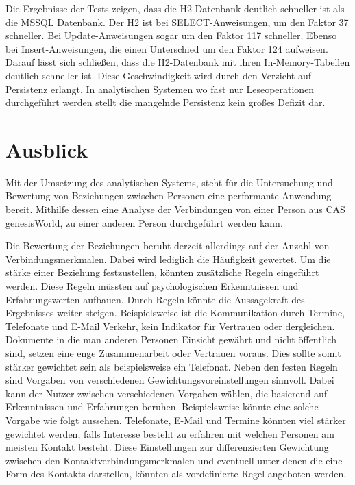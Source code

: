 Die Ergebnisse der Tests zeigen, dass die H2-Datenbank deutlich schneller ist als die MSSQL Datenbank. Der H2 ist bei SELECT-Anweisungen, um den Faktor 37 schneller. Bei Update-Anweisungen sogar um den Faktor 117 schneller. Ebenso bei Insert-Anweisungen, die einen Unterschied um den Faktor 124 aufweisen. Darauf lässt sich schließen, dass die H2-Datenbank mit ihren In-Memory-Tabellen deutlich schneller ist. Diese Geschwindigkeit wird durch den Verzicht auf Persistenz erlangt. In analytischen Systemen wo fast nur Leseoperationen durchgeführt werden stellt die mangelnde Persistenz kein großes Defizit dar. 

\section{Ausblick}
\label{ch:Ergebnis:sec:Ausblick}

Mit der Umsetzung des analytischen Systems, steht für die Untersuchung und Bewertung von Beziehungen zwischen Personen eine performante Anwendung bereit. Mithilfe dessen eine Analyse der Verbindungen von einer Person aus CAS genesisWorld, zu einer anderen Person durchgeführt werden kann.  

Die Bewertung der Beziehungen beruht derzeit allerdings auf der Anzahl von Verbindungsmerkmalen. Dabei wird lediglich die Häufigkeit gewertet. Um die stärke einer Beziehung festzustellen, könnten zusätzliche Regeln eingeführt werden. Diese Regeln müssten auf psychologischen Erkenntnissen und Erfahrungswerten aufbauen. Durch Regeln könnte die Aussagekraft des Ergebnisses weiter steigen. Beispielsweise ist die Kommunikation durch Termine, Telefonate und E-Mail Verkehr, kein Indikator für Vertrauen oder dergleichen. Dokumente in die man anderen Personen Einsicht gewährt und nicht öffentlich sind, setzen eine enge Zusammenarbeit oder Vertrauen voraus. Dies sollte somit stärker gewichtet sein als beispielsweise ein Telefonat. Neben den festen Regeln sind Vorgaben von verschiedenen Gewichtungsvoreinstellungen sinnvoll. Dabei kann der Nutzer zwischen verschiedenen Vorgaben wählen, die basierend auf Erkenntnissen und Erfahrungen beruhen. Beispielsweise könnte eine solche Vorgabe wie folgt aussehen. Telefonate, E-Mail und Termine könnten viel stärker gewichtet werden, falls Interesse besteht zu erfahren mit welchen Personen am meisten Kontakt besteht. Diese Einstellungen zur differenzierten Gewichtung zwischen den Kontaktverbindungsmerkmalen und eventuell unter denen die eine Form des Kontakts darstellen, könnten als vordefinierte Regel angeboten werden.

